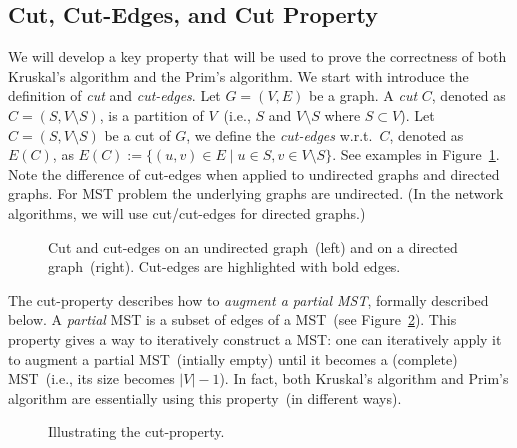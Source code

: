 
\subsection*{Cut, Cut-Edges, and Cut Property}

We will develop a key property that will be used to prove the correctness of both Kruskal's algorithm
and the Prim's algorithm. We start with introduce the definition of \emph{cut} and \emph{cut-edges}.
Let $G = (V, E)$ be a graph. A \emph{cut} $C$, denoted as $C = (S, V\setminus S)$,
is a partition of $V$~(i.e., $S$ and $V\setminus S$ where $S\subset V$).
Let $C = (S, V\setminus S)$ be a cut of $G$, we define the \emph{cut-edges} w.r.t.\ $C$,
denoted as $E(C)$, as $E(C) := \{(u,v)\in E\mid u\in S, v\in V\setminus S\}$.
See examples in Figure~\ref{fig:cut}.  Note the difference of cut-edges
when applied to undirected graphs and directed graphs.
For MST problem the underlying graphs are undirected. (In the network algorithms, we will
use cut/cut-edges for directed graphs.)

\begin{figure}[h]
\centering{}
\caption{Cut and cut-edges on an undirected graph~(left) and on a directed graph~(right).
Cut-edges are highlighted with bold edges.}
\label{fig:cut}
\end{figure}

The cut-property describes how to \emph{augment a partial MST}, 
formally described below.
A \emph{partial} MST is a subset of edges of a MST~(see Figure~\ref{fig:spanning}).
This property gives a way to iteratively construct a MST: one can iteratively
apply it to augment a partial MST~(intially empty) until it becomes a (complete) 
MST~(i.e., its size becomes $|V| - 1$).
In fact, both Kruskal's algorithm and Prim's algorithm
are essentially using this property~(in different ways).

\begin{figure}[b]
\centering{}
\caption{Illustrating the cut-property.}
\label{fig:spanning}
\end{figure}


